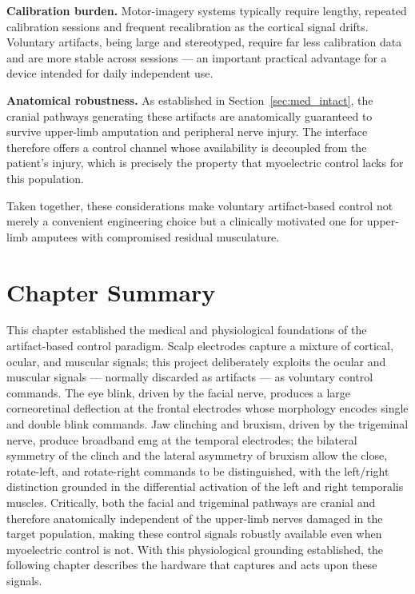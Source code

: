 \textbf{Calibration burden.} Motor-imagery systems typically require
lengthy, repeated calibration sessions and frequent recalibration as
the cortical signal drifts. Voluntary artifacts, being large and
stereotyped, require far less calibration data and are more stable
across sessions --- an important practical advantage for a device
intended for daily independent use.

\textbf{Anatomical robustness.} As established in
Section~\ref{sec:med_intact}, the cranial pathways generating these
artifacts are anatomically guaranteed to survive upper-limb
amputation and peripheral nerve injury. The interface therefore offers
a control channel whose availability is decoupled from the patient's
injury, which is precisely the property that myoelectric control
lacks for this population.

Taken together, these considerations make voluntary artifact-based
control not merely a convenient engineering choice but a clinically
motivated one for upper-limb amputees with compromised residual
musculature.

\section{Chapter Summary}
\label{sec:med_summary}

This chapter established the medical and physiological foundations of
the artifact-based control paradigm. Scalp electrodes capture a
mixture of cortical, ocular, and muscular signals; this project
deliberately exploits the ocular and muscular signals --- normally
discarded as artifacts --- as voluntary control commands. The eye
blink, driven by the facial nerve, produces a large corneoretinal
deflection at the frontal electrodes whose morphology encodes single
and double blink commands. Jaw clinching and bruxism, driven
by the trigeminal nerve, produce broadband \acrshort{emg} at the
temporal electrodes; the bilateral symmetry of the clinch and the
lateral asymmetry of bruxism allow the close, rotate-left, and
rotate-right commands to be distinguished, with the left/right
distinction grounded in the differential activation of the left and
right temporalis muscles. Critically, both the facial and trigeminal
pathways are cranial and therefore anatomically independent of the
upper-limb nerves damaged in the target population, making these
control signals robustly available even when myoelectric control is
not. With this physiological grounding established, the following
chapter describes the hardware that captures and acts upon these
signals.